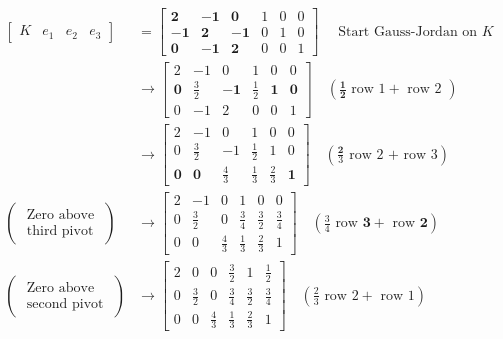 \begin{example}
    \begin{equation} \begin{aligned}\left[\begin{array}{llll}K & e_{1} & e_{2} & e_{3}\end{array}\right] & =\left[\begin{array}{rrrrrr}\mathbf{2} & -\mathbf{1} & \mathbf{0} & 1 & 0 & 0 \\ -\mathbf{1} & \mathbf{2} & -\mathbf{1} & 0 & 1 & 0 \\ \mathbf{0} & -\mathbf{1} & \mathbf{2} & 0 & 0 & 1\end{array}\right] \quad \text { Start Gauss-Jordan on } K                                                  \\ & \rightarrow\left[\begin{array}{rrrrrr}2 & -1 & 0 & 1 & 0 & 0 \\ \mathbf{0} & \frac{3}{2} & -\mathbf{1} & \frac{1}{2} & \mathbf{1} & \mathbf{0} \\ 0 & -1 & 2 & 0 & 0 & 1\end{array}\right] \quad\left(\frac{\mathbf{1}}{\mathbf{2}} \text { row } 1+\text { row 2 }\right) \\ & \rightarrow\left[\begin{array}{rrrrrr}2 & -1 & 0 & 1 & 0 & 0 \\ 0 & \frac{3}{2} & -1 & \frac{1}{2} & 1 & 0 \\ \mathbf{0} & \mathbf{0} & \frac{4}{3} & \frac{1}{3} & \frac{2}{3} & \mathbf{1}\end{array}\right] \quad \left(\frac{\mathbf{2}}{3} \text { row 2 + row 3}\right)\\
               \left(\begin{array}{c}\text { Zero above } \\ \text { third pivot }\end{array}\right) & \rightarrow\left[\begin{array}{rrrrrr}2 & -1 & 0 & 1 & 0 & 0 \\ 0 & \frac{3}{2} & 0 & \frac{3}{4} & \frac{3}{2} & \frac{3}{4} \\ 0 & 0 & \frac{4}{3} & \frac{1}{3} & \frac{2}{3} & 1\end{array}\right] \quad\left(\frac{3}{4} \text{ row } \mathbf{3}+ \text{ row } \mathbf{2}\right) \\
               \left(\begin{array}{l}\text { Zero above } \\ \text { second pivot }\end{array}\right) & \rightarrow\left[\begin{array}{cccccc}2 & 0 & 0 & \frac{3}{2} & 1 & \frac{1}{2} \\ 0 & \frac{3}{2} & 0 & \frac{3}{4} & \frac{3}{2} & \frac{3}{4} \\ 0 & 0 & \frac{4}{3} & \frac{1}{3} & \frac{2}{3} & 1\end{array}\right] \quad\left(\frac{2}{3} \text{ row } 2+ \text{ row }1 \right)
        \end{aligned} \end{equation}



\end{example}
